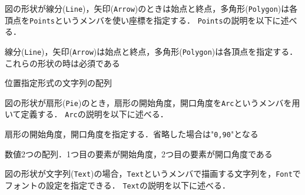 図の形状が線分({\tt Line})，矢印({\tt Arrow})のときは始点と終点，多角形({\tt Polygon})は各頂点を{\tt Points}というメンバを使い座標を指定する．
{\tt Points}の説明を以下に述べる．

\begin{description}
{\nopagebreak
\item[\texttt{Points}] \mbox{}
    \vspace{-1zw}
    \begin{description}
    \setlength{\itemsep}{-1.5\itemsep}
    \item[説明] 線分({\tt Line})，矢印({\tt Arrow})は始点と終点，多角形({\tt Polygon})は各頂点を指定する．これらの形状の時は必須である
    \item[値] 位置指定形式の文字列の配列
    \end{description}
}
\end{description}

図の形状が扇形({\tt Pie})のとき，扇形の開始角度，開口角度を{\tt Arc}というメンバを用いて定義する．
{\tt Arc}の説明を以下に述べる．

\begin{description}
{\nopagebreak
\item[\texttt{Arc}] \mbox{}
    \vspace{-1zw}
    \begin{description}
    \setlength{\itemsep}{-1.5\itemsep}
    \item[説明] 扇形の開始角度，開口角度を指定する．省略した場合は"{\tt 0,90}"となる
    \item[値] 数値2つの配列．1つ目の要素が開始角度，2つ目の要素が開口角度である
    \end{description}
}
\end{description}

図の形状が文字列({\tt Text})の場合，{\tt Text}というメンバで描画する文字列を，{\tt Font}でフォントの設定を指定できる．
{\tt Text}の説明を以下に述べる．

